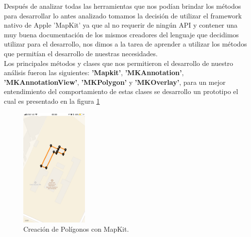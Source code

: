  Después de analizar todas las herramientas que nos podían brindar los métodos para desarrollar lo antes analizado tomamos la decisión de utilizar el framework nativo de Apple 'MapKit' ya que al no requerir de ningún API y contener una muy buena documentación de los mismos creadores del lenguaje que decidimos utilizar para el desarrollo, nos dimos a la tarea de aprender a utilizar los métodos que permitían el desarrollo de nuestras necesidades.\\
 
 Los principales  métodos y clases que nos permitieron el desarrollo de nuestro análisis fueron las siguientes: \textbf{'Mapkit'}, \textbf{'MKAnnotation'}, \textbf{'MKAnnotationView'}, \textbf{'MKPolygon'} y \textbf{'MKOverlay'}, para un mejor entendimiento del comportamiento de estas clases se desarrollo un prototipo el cual es presentado en la figura \ref{mapkit}\\
 \begin{figure}[h!]
 	\begin{center}
 		\includegraphics[width=0.3\textwidth]{images/maqueta/mapkit.png}
 		\caption{Creación de Polígonos con MapKit.}
 		\label{mapkit}
 	\end{center}
 \end{figure}

